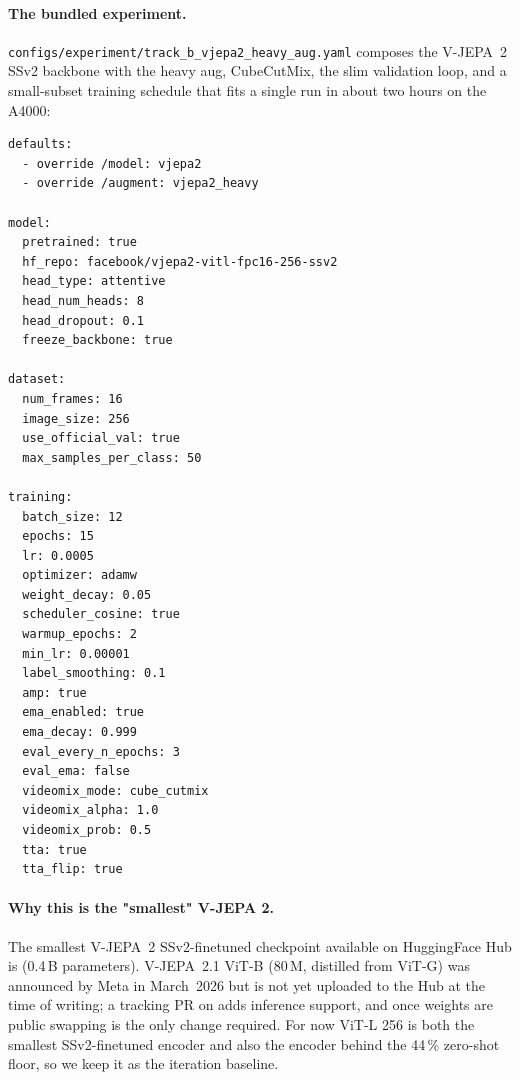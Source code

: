 \paragraph{The bundled  experiment.}
\texttt{configs/\allowbreak experiment/\allowbreak track\_b\_vjepa2\_heavy\_aug.yaml}
composes the V-JEPA~2 SSv2 backbone with the heavy aug, CubeCutMix, the slim
validation loop, and a small-subset training schedule that fits a
single run in about two hours on the A4000:
\begin{lstlisting}[style=yaml]
defaults:
  - override /model: vjepa2
  - override /augment: vjepa2_heavy

model:
  pretrained: true
  hf_repo: facebook/vjepa2-vitl-fpc16-256-ssv2
  head_type: attentive
  head_num_heads: 8
  head_dropout: 0.1
  freeze_backbone: true

dataset:
  num_frames: 16
  image_size: 256
  use_official_val: true
  max_samples_per_class: 50

training:
  batch_size: 12
  epochs: 15
  lr: 0.0005
  optimizer: adamw
  weight_decay: 0.05
  scheduler_cosine: true
  warmup_epochs: 2
  min_lr: 0.00001
  label_smoothing: 0.1
  amp: true
  ema_enabled: true
  ema_decay: 0.999
  eval_every_n_epochs: 3
  eval_ema: false
  videomix_mode: cube_cutmix
  videomix_alpha: 1.0
  videomix_prob: 0.5
  tta: true
  tta_flip: true
\end{lstlisting}

\paragraph{Why this is the "smallest" V-JEPA 2.}
The smallest V-JEPA~2 SSv2-finetuned checkpoint available on
HuggingFace Hub is  (0.4\,B parameters).
V-JEPA~2.1 ViT-B (80\,M, distilled from ViT-G) was announced by Meta
in March~2026 \cite{MurLabadia2026VJEPA21} but is not yet uploaded
to the Hub at the time of writing; a tracking PR on
 adds inference support, and once weights are
public swapping  is the only change required.
For now ViT-L 256 is both the smallest SSv2-finetuned encoder and
also the encoder behind the 44\,\% zero-shot floor, so we keep it as
the iteration baseline.


